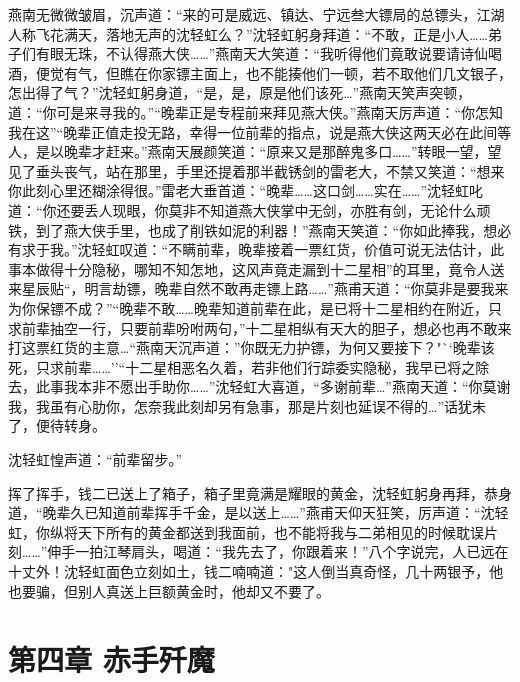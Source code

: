 \documentclass[12pt,oneside]{book}
\begin{document}
燕南无微微皱眉，沉声道：``来的可是威远、镇达、宁远叁大镖局的总镖头，江湖人称飞花满天，落地无声的沈轻虹么？''沈轻虹躬身拜道：``不敢，正是小人\ldots\ldots 弟子们有眼无珠，不认得燕大侠\ldots\ldots{}''燕南天大笑道：``我听得他们竟敢说要请诗仙喝酒，便觉有气，但瞧在你家镖主面上，也不能揍他们一顿，若不取他们几文银子，怎出得了气？''沈轻虹躬身道，``是，是，原是他们该死\ldots{}''燕南天笑声突顿，道：``你可是来寻我的。''``晚辈正是专程前来拜见燕大侠。''燕南天厉声道：``你怎知我在这''``晚辈正值走投无路，幸得一位前辈的指点，说是燕大侠这两天必在此间等人，是以晚辈才赶来。''燕南天展颜笑道：``原来又是那醉鬼多口\ldots\ldots{}''转眼一望，望见了垂头丧气，站在那里，手里还提着那半截锈剑的雷老大，不禁又笑道：``想来你此刻心里还糊涂得很。''雷老大垂首道：``晚辈\ldots\ldots 这口剑\ldots\ldots 实在\ldots\ldots{}''沈轻虹叱道：``你还要丢人现眼，你莫非不知道燕大侠掌中无剑，亦胜有剑，无论什么顽铁，到了燕大侠手里，也成了削铁如泥的利器！''燕南天笑道：``你如此捧我，想必有求于我。''沈轻虹叹道：``不瞒前辈，晚辈接着一票红货，价值可说无法估计，此事本做得十分隐秘，哪知不知怎地，这风声竟走漏到十二星相''的耳里，竟令人送来星辰贴``，明言劫镖，晚辈自然不敢再走镖上路\ldots\ldots{}''燕甫天道：``你莫非是要我来为你保镖不成？''``晚辈不敢\ldots\ldots 晚辈知道前辈在此，是已将十二星相约在附近，只求前辈抽空一行，只要前辈吩咐两句，''十二星相纵有天大的胆子，想必也再不敢来打这票红货的主意\ldots{}``燕南天沉声道：''你既无力护镖，为何又要接下？"``晚辈该死，只求前辈\ldots\ldots{}''``十二星相恶名久着，若非他们行踪委实隐秘，我早已将之除去，此事我本非不愿出手助你\ldots\ldots{}''沈轻虹大喜道，``多谢前辈\ldots{}''燕南天道：``你莫谢我，我虽有心肋你，怎奈我此刻却另有急事，那是片刻也延误不得的\ldots{}''话犹未了，便待转身。

沈轻虹惶声道：``前辈留步。''

挥了挥手，钱二已送上了箱子，箱子里竟满是耀眼的黄金，沈轻虹躬身再拜，恭身道，``晚辈久已知道前辈挥手千金，是以送上\ldots\ldots{}''燕甫天仰天狂笑，厉声道：``沈轻虹，你纵将天下所有的黄金都送到我面前，也不能将我与二弟相见的时候耽误片刻\ldots\ldots{}''伸手一拍江琴肩头，喝道：``我先去了，你跟着来！''八个字说完，人已远在十丈外！沈轻虹面色立刻如土，钱二喃喃道："这人倒当真奇怪，几十两银予，他也要骗，但别人真送上巨额黄金时，他却又不要了。

\hypertarget{ux7b2cux56dbux7ae0-ux8d64ux624bux6b7cux9b54}{%
\chapter{第四章
赤手歼魔}\label{ux7b2cux56dbux7ae0-ux8d64ux624bux6b7cux9b54}}
\end{document}
